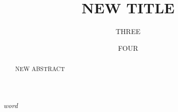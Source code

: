 \documentclass{article}
\title{NEW TITLE}
\author{THREE \and FOUR}
\begin{document}
\maketitle

\begin{abstract}
NEW ABSTRACT
\end{abstract}

\tableofcontents

\textit{word}\par
\end{document}
